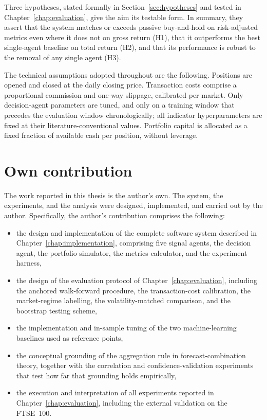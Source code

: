 Three hypotheses, stated formally in Section~\ref{sec:hypotheses} and tested in Chapter~\ref{chap:evaluation}, give the aim its testable form. In summary, they assert that the system matches or exceeds passive buy-and-hold on risk-adjusted metrics even where it does not on gross return (H1), that it outperforms the best single-agent baseline on total return (H2), and that its performance is robust to the removal of any single agent (H3).

The technical assumptions adopted throughout are the following. Positions are opened and closed at the daily closing price. Transaction costs comprise a proportional commission and one-way slippage, calibrated per market. Only decision-agent parameters are tuned, and only on a training window that precedes the evaluation window chronologically; all indicator hyperparameters are fixed at their literature-conventional values. Portfolio capital is allocated as a fixed fraction of available cash per position, without leverage.

\section{Own contribution}\label{sec:own_contribution}

The work reported in this thesis is the author's own. The system, the experiments, and the analysis were designed, implemented, and carried out by the author. Specifically, the author's contribution comprises the following:

\begin{itemize}
    \item the design and implementation of the complete software system described in Chapter~\ref{chap:implementation}, comprising five signal agents, the decision agent, the portfolio simulator, the metrics calculator, and the experiment harness,
    \item the design of the evaluation protocol of Chapter~\ref{chap:evaluation}, including the anchored walk-forward procedure, the transaction-cost calibration, the market-regime labelling, the volatility-matched comparison, and the bootstrap testing scheme,
    \item the implementation and in-sample tuning of the two machine-learning baselines used as reference points,
    \item the conceptual grounding of the aggregation rule in forecast-combination theory, together with the correlation and confidence-validation experiments that test how far that grounding holds empirically,
    \item the execution and interpretation of all experiments reported in Chapter~\ref{chap:evaluation}, including the external validation on the FTSE~100.
\end{itemize}

